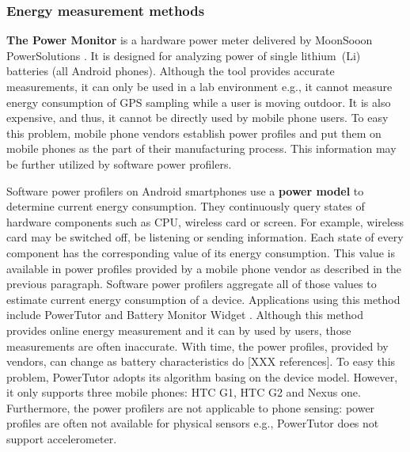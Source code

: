 \subsubsection{Energy measurement methods}

\hspace{10pt} \textbf{The Power Monitor} is a hardware power meter delivered by MoonSooon PowerSolutions \cite{monsoon:powermonitor}.  It is designed for analyzing power of single lithium\ (Li) batteries (all Android phones). Although the tool provides accurate measurements, it can only be used in a lab environment e.g., it cannot measure energy consumption of GPS sampling while a user is moving outdoor. It is also expensive, and thus, it cannot be directly used by mobile phone users. To easy this problem, mobile phone vendors establish power profiles and put them on mobile phones \cite{android:powerprofiles} as the part of their manufacturing process. This information may be further utilized by software power profilers.

Software power profilers on Android smartphones use a \textbf{power model} to determine current energy consumption. They continuously query states of hardware components such as CPU, wireless card or screen. For example, wireless card may be switched off, be listening or sending information. Each state of every component has the corresponding value of its energy consumption. This value is available in power profiles provided by a mobile phone vendor as described in the previous paragraph. Software power profilers aggregate all of those values to estimate current energy consumption of a device. Applications using this method include PowerTutor \cite{zhang:powertutor} and Battery Monitor Widget \cite{googleplay:batterymonitorwidget}. Although this method provides online energy measurement and it can by used by users, those measurements are often inaccurate. With time, the power profiles, provided by vendors, can change as battery characteristics do [XXX references]. To easy this problem, PowerTutor adopts its algorithm basing on the device model. However, it only supports three mobile phones: HTC G1, HTC G2 and Nexus one. Furthermore, the power profilers are not applicable to phone sensing: power profiles are often not available for physical sensors e.g., PowerTutor does not support accelerometer.

